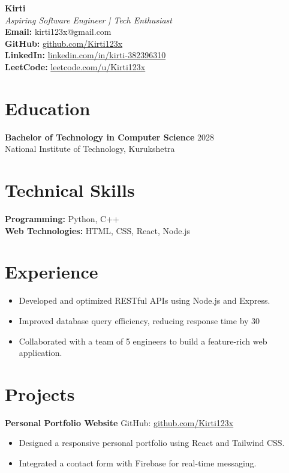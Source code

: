 \documentclass[a4paper,10pt]{article}
\begin{document}
\begin{center}
    {\Huge \textbf{Kirti}} \\
    \vspace{5pt}
    \small \textit{Aspiring Software Engineer | Tech Enthusiast} \\
    \vspace{5pt}
    \textbf{Email:} kirti123x@gmail.com\\  \textbf{GitHub:} \href{https://github.com/Kirti123x}{github.com/Kirti123x}\\   \textbf{LinkedIn:} \href{https://www.linkedin.com/in/kirti-382396310}{linkedin.com/in/kirti-382396310}\\  \textbf{LeetCode:} \href{https://leetcode.com/u/Kirti123x/}{leetcode.com/u/Kirti123x}\\ 
\end{center}

\section*{Education}
\hline
\vspace{5pt}
\textbf{Bachelor of Technology in Computer Science} \hfill 2028 \\
National Institute of Technology, Kurukshetra

\section*{Technical Skills}
\hline
\vspace{5pt}
\textbf{Programming:} Python, C++ \\
\textbf{  Web Technologies:} HTML, CSS, React, Node.js\\

\section*{Experience}
\hline
\vspace{5pt}
\begin{itemize}[leftmargin=10pt]
    \item Developed and optimized RESTful APIs using Node.js and Express.
    \item Improved database query efficiency, reducing response time by 30%
    \item Collaborated with a team of 5 engineers to build a feature-rich web application.
\end{itemize}

\section*{Projects}
\hline
\vspace{5pt}
\textbf{Personal Portfolio Website} \hfill GitHub: \href{https://github.com/Kirti123x}{github.com/Kirti123x} \\
\begin{itemize}[leftmargin=10pt]
    \item Designed a responsive personal portfolio using React and Tailwind CSS.
    \item Integrated a contact form with Firebase for real-time messaging.
\end{itemize}
\end{document}
